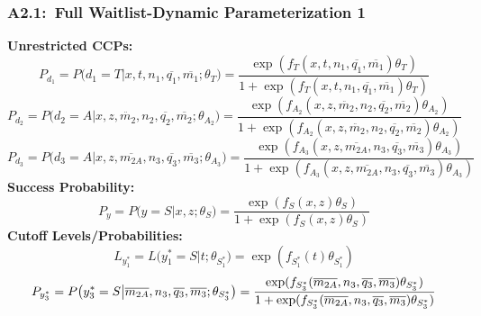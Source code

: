\documentclass[12pt, aspectratio=169]{beamer}
\begin{document}
\begin{frame}[label=fwdp1]
\frametitle{A2.1:\ Full Waitlist-Dynamic Parameterization 1}
\textbf{Unrestricted CCPs:}
\vspace{-5pt}
\footnotesize
\begin{equation*}
P_{d_1} = P\big(d_1=T\big|x,t,n_1,\overline{q_1},\overline{m_1};\theta_T\big) = \frac{\exp(f_T(x,t,n_1,\overline{q_1},\overline{m_1})\theta_T)}{1+\exp(f_T(x,t,n_1,\overline{q_1},\overline{m_1})\theta_T)}
\end{equation*}
\begin{equation*}
P_{d_2} = P\big(d_2=A\big|x,z,\ddot{m_2},n_2,\overline{q_2},\overline{m_2};\theta_{A_2}\big) = \frac{\exp(f_{A_2}(x,z,\ddot{m_2},n_2,\overline{q_2},\overline{m_2})\theta_{A_2})}{1+\exp(f_{A_2}(x,z,\ddot{m_2},n_2,\overline{q_2},\overline{m_2})\theta_{A_2})}
\end{equation*}
\begin{equation*}
P_{d_3} = P\big(d_3=A\big|x,z,\overline{m_{2A}},n_3,\overline{q_3},\overline{m_3};\theta_{A_3}\big) = \frac{\exp(f_{A_3}(x,z,\overline{m_{2A}},n_3,\overline{q_3},\overline{m_3})\theta_{A_3})}{1+\exp(f_{A_3}(x,z,\overline{m_{2A}},n_3,\overline{q_3},\overline{m_3})\theta_{A_3})}
\end{equation*}
\normalsize
\textbf{Success Probability:}
\vspace{-5pt}
\footnotesize
\begin{equation*}
P_y = P\big(y = S\big|x,z;\theta_S\big) = \frac{\exp(f_S(x,z)\theta_S)}{1+\exp(f_S(x,z)\theta_S)}
\end{equation*}
\normalsize
\textbf{Cutoff Levels/Probabilities:}
\vspace{-5pt}
\footnotesize
\begin{equation*}
L_{y_1^*} = L\big(y_1^* = S\big|t;\theta_{S_1^*}\big) = \exp(f_{S_1^*}(t)\theta_{S_1^*})
\end{equation*}
\begin{equation*}
P_{y_3^*} = P\big(y_3^* = S\big|\overline{m_{2A}},n_3,\overline{q_3},\overline{m_3};\theta_{S_3^*}\big) = \frac{\exp(f_{S_3^*}(\overline{m_{2A}},n_3,\overline{q_3},\overline{m_3})\theta_{S_3^*})}{1+\exp(f_{S_3^*}(\overline{m_{2A}},n_3,\overline{q_3},\overline{m_3})\theta_{S_3^*})}
\vspace{-5pt}
\end{equation*}
\hyperlink{wmo}{}
\end{frame}
\end{document}
